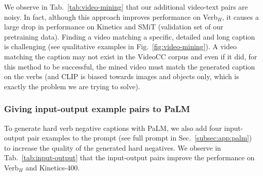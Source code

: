 We observe in Tab.~\ref{tab:video-mining} that our additional video-text pairs are noisy. In fact, although this approach improves performance on Verb$_H$, it causes a large drop in performance on Kinetics and SMiT (validation set of our pretraining data). Finding a video matching a specific, detailed and long caption is challenging (see qualitative examples in Fig.~\ref{fig:video-mining}). A video matching the caption may not exist in the VideoCC corpus and even if it did, for this method to be successful, the mined video must match the generated caption on the verbs (and CLIP is biased towards images and objects only, which is exactly the problem we are trying to solve). 







\subsubsection{Giving input-output example pairs to PaLM}\label{subsec:input-output}
To generate hard verb negative captions with PaLM, we also add four input-output pair examples to the prompt (see full prompt in Sec.~\ref{subsec:app:palm}) to increase the quality of the generated hard negatives. We observe in Tab.~\ref{tab:input-output} that the input-output pairs improve the performance on Verb$_H$ and Kinetics-400.

\begin{table}
    \setlength{\tabcolsep}{22pt}
    \centering
     \vspace{0.2cm}
    \caption{
    \textbf{Inclusion of input-output pairs in PaLM prompt.} We report multi-choice accuracy on Verb$_H$~\cite{park-etal-2022-exposing} and Kinetics-400 top-1 accuracy. We observe that including input-output pairs in the PaLM prompt for generating hard negative captions increases the performance on both benchmarks. We note that one hard negative is sampled for each video here.}
    \label{tab:input-output}
 
\end{table}

